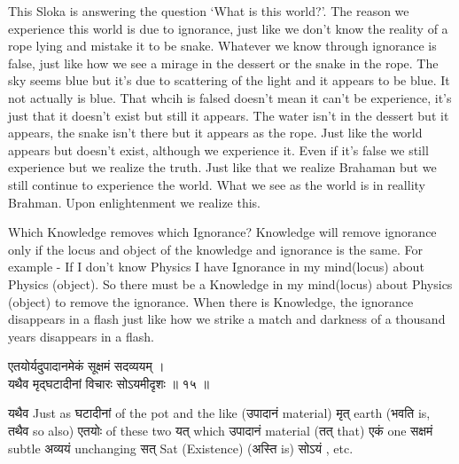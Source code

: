 \documentclass{article}
\begin{document}
\begin{oframed}

This Sloka is answering the question `What is this world?'. The reason we
experience this world is due to ignorance, just like we don't know the
reality of a rope lying and mistake it to be snake.  Whatever we know
through ignorance is false, just like how we see a mirage in the dessert or
the snake in the rope. The sky seems blue but it's due to scattering of the
light and it appears to be blue. It not actually is blue. That whcih is
falsed doesn't mean it can't be experience, it's just that it doesn't exist
but still it appears. The water isn't in the dessert but it appears, the
snake isn't there but it appears as the rope. Just like the world appears
but doesn't exist, although we experience it. Even if it's false we still
experience but we realize the truth. Just like that we realize Brahaman but
we still continue to experience the world.  What we see as the world is in
reallity Brahman. Upon enlightenment we realize this.

Which Knowledge removes which Ignorance? Knowledge will remove ignorance only
if the locus and object of the knowledge and ignorance is the same. For
example - If I don't know Physics I have Ignorance in my mind(locus) about
Physics (object). So there must be a Knowledge in my mind(locus) about
Physics (object) to remove the ignorance. When there is Knowledge, the
ignorance disappears in a flash just like how we strike a match and
darkness of a thousand years disappears in a flash.

\end{oframed}

\bigskip

\begin{large}
\begin{center}
    \begin{hindi}
    एतयोर्यदुपादानमेकं सूक्षमं सदव्ययम् ।\\
    यथैव मृद्घटादीनां विचारः सोऽयमीदृशः ॥ १५ ॥
    \end{hindi}
\end{center}
\end{large}

\texthindi{यथैव }
Just as
\texthindi{घटादीनां }
{of the pot and the like }
(\texthindi{उपादानं }
material)
\texthindi{मृत् }
earth
(\texthindi{भवति }
is, 
\texthindi{तथैव }
so also)
\texthindi{एतयोः }
{of these two }
\texthindi{यत् }
{which }
\texthindi{उपादानं }
{material }
(\texthindi{तत् }
that)
\texthindi{एकं }
one
\texthindi{सक्षमं }
{subtle }
\texthindi{अव्ययं }
{unchanging }
\texthindi{सत् }
Sat (Existence)
(\texthindi{अस्ति}
is)
\texthindi{सोऽयं , }
etc.
\end{document}
